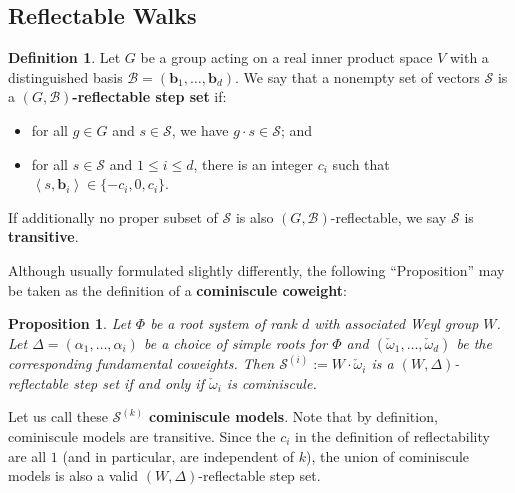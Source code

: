 \documentclass[A4,12pt]{article}
\newcommand{\<}{\left\langle}
\renewcommand{\>}{\right\rangle}
\newcommand{\coweight}{\check{\omega}}
\newcommand{\steps}{\mathcal{S}}
\newtheorem{proposition}[theorem]{Proposition}
\theoremstyle{definition}
\newtheorem*{definition}{Definition}
\theoremstyle{example}
\begin{document}
\subsection{Reflectable Walks}

\begin{definition}
Let $G$ be a group acting on a real inner product space $V$ with a distinguished basis $\mathcal{B}=(\mathbf{b}_1,\dots, \mathbf{b}_d)$. We say that a nonempty set of vectors $\steps$ is a \textbf{$(G,\mathcal{B})$-reflectable step set} if:
\begin{itemize}
\item for all $g\in G$ and $s\in \steps$, we have $g\cdot s\in \steps$; and
\item for all $s\in \steps$ and $1\leq i\leq d$, there is an integer $c_i$ such that $\<s, \mathbf{b}_i\>\in \{-c_i,0,c_i\}$.
\end{itemize}
If additionally no proper subset of $\steps$ is also $(G,\mathcal{B})$-reflectable, we say $\steps$ is \textbf{transitive}.
\end{definition}

Although usually formulated slightly differently, the following ``Proposition'' may be taken as the definition of a \textbf{cominiscule coweight}:

\begin{proposition}
Let $\Phi$ be a root system of rank $d$ with associated Weyl group $W$. Let $\Delta=(\alpha_1,\dots,\alpha_i)$ be a choice of simple roots for $\Phi$ and $(\coweight_1,\dots,\coweight_d)$ be the corresponding fundamental coweights. Then $\steps^{(i)}:=W\cdot\coweight_i$ is a $(W,\Delta)$-reflectable step set if and only if $\coweight_i$ is cominiscule.
\end{proposition}

Let us call these $\steps^{(k)}$ \textbf{cominiscule models}. Note that by definition, cominiscule models are transitive. Since the $c_i$ in the definition of reflectability are all $1$ (and in particular, are independent of $k$), the union of cominiscule models is also a valid $(W,\Delta)$-reflectable step set.
\end{document}
